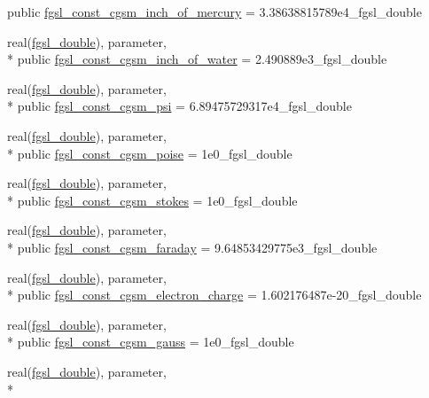 \begin{DoxyCompactItemize}
public \hyperlink{classfgsl_a3cedc29e68dc7bfeb7a43c07d1496c6e}{fgsl\-\_\-const\-\_\-cgsm\-\_\-inch\-\_\-of\-\_\-mercury} = 3.\-38638815789e4\-\_\-fgsl\-\_\-double
\item 
real(\hyperlink{classfgsl_a9af5113378e0f000eb479d3f90196ddf}{fgsl\-\_\-double}), parameter, \\*
public \hyperlink{classfgsl_ae3e9d91a0883033afa45f2237810a306}{fgsl\-\_\-const\-\_\-cgsm\-\_\-inch\-\_\-of\-\_\-water} = 2.\-490889e3\-\_\-fgsl\-\_\-double
\item 
real(\hyperlink{classfgsl_a9af5113378e0f000eb479d3f90196ddf}{fgsl\-\_\-double}), parameter, \\*
public \hyperlink{classfgsl_adbc0f817c0f6ab5ff3cb517430c2a28f}{fgsl\-\_\-const\-\_\-cgsm\-\_\-psi} = 6.\-89475729317e4\-\_\-fgsl\-\_\-double
\item 
real(\hyperlink{classfgsl_a9af5113378e0f000eb479d3f90196ddf}{fgsl\-\_\-double}), parameter, \\*
public \hyperlink{classfgsl_ac2108186e2fec1e447f96ad1ab30ae23}{fgsl\-\_\-const\-\_\-cgsm\-\_\-poise} = 1e0\-\_\-fgsl\-\_\-double
\item 
real(\hyperlink{classfgsl_a9af5113378e0f000eb479d3f90196ddf}{fgsl\-\_\-double}), parameter, \\*
public \hyperlink{classfgsl_a3d38806d98751c252e4450fb1df5b246}{fgsl\-\_\-const\-\_\-cgsm\-\_\-stokes} = 1e0\-\_\-fgsl\-\_\-double
\item 
real(\hyperlink{classfgsl_a9af5113378e0f000eb479d3f90196ddf}{fgsl\-\_\-double}), parameter, \\*
public \hyperlink{classfgsl_a147d94db9ca3b698ccb636b75b27484e}{fgsl\-\_\-const\-\_\-cgsm\-\_\-faraday} = 9.\-64853429775e3\-\_\-fgsl\-\_\-double
\item 
real(\hyperlink{classfgsl_a9af5113378e0f000eb479d3f90196ddf}{fgsl\-\_\-double}), parameter, \\*
public \hyperlink{classfgsl_a5dafed1eec73194b34fc66d1e9337dc3}{fgsl\-\_\-const\-\_\-cgsm\-\_\-electron\-\_\-charge} = 1.\-602176487e-\/20\-\_\-fgsl\-\_\-double
\item 
real(\hyperlink{classfgsl_a9af5113378e0f000eb479d3f90196ddf}{fgsl\-\_\-double}), parameter, \\*
public \hyperlink{classfgsl_af917fb04d607724208d74a65a71644fe}{fgsl\-\_\-const\-\_\-cgsm\-\_\-gauss} = 1e0\-\_\-fgsl\-\_\-double
\item 
real(\hyperlink{classfgsl_a9af5113378e0f000eb479d3f90196ddf}{fgsl\-\_\-double}), parameter, \\*

\end{DoxyCompactItemize}
